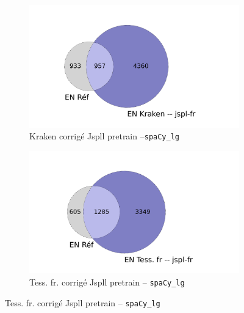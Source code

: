 \begin{figure}[h!]
    \begin{minipage}{7cm}
  \begin{subfigure}{1\textwidth}
  \includegraphics[width=1\textwidth]{IMAGES/INTERSECTIONS_GLOBALES/ELTeCFRA_Kraken -- jspl-fr_spacy-lg-concat_intersection.png} 
  \caption{Kraken corrigé Jspll pretrain --\texttt{spaCy\_lg}}
  \label{fig:ELTeCFRA_Kraken -- jspl-fr_spacy-lg-concat_intersection.png}
  \end{subfigure}
  \end{minipage}
  \begin{minipage}{7cm}
  \begin{subfigure}{1\textwidth}
  \includegraphics[width=1\textwidth]{IMAGES/INTERSECTIONS_GLOBALES/ELTeCFRA_Tess. fr -- jspl-fr_spacy-lg-concat_intersection.png} 
  \caption{Tess. fr. corrigé Jspll pretrain -- \texttt{spaCy\_lg}}
 \label{fig:ELTeCFRA_Tess. fr -- jspl-fr_spacy-lg-concat_intersection.png}
  \end{subfigure}
    \end{minipage}

\end{figure}
